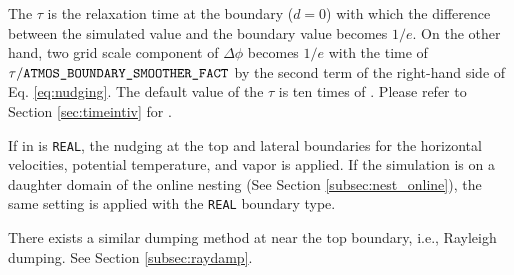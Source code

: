 The $\tau$ is the relaxation time at the boundary ($d=0$) with which the difference between the simulated value and the boundary value becomes $1/e$.
On the other hand, two grid scale component of $\Delta \phi$ becomes $1/e$ with the time of $\tau/\nmitemeq{ATMOS_BOUNDARY_SMOOTHER_FACT}$ by the second term of the right-hand side of Eq. \ref{eq:nudging}.
The default value of the $\tau$ is ten times of .
Please refer to Section \ref{sec:timeintiv} for .


If  in  is \verb|REAL|, the nudging at the top and lateral boundaries for the horizontal velocities, potential temperature, and vapor is applied.
If the simulation is on a daughter domain of the online nesting (See Section \ref{subsec:nest_online}), the same setting is applied with the \verb|REAL| boundary type.


There exists a similar dumping method at near the top boundary, i.e., Rayleigh dumping. See Section \ref{subsec:raydamp}.
